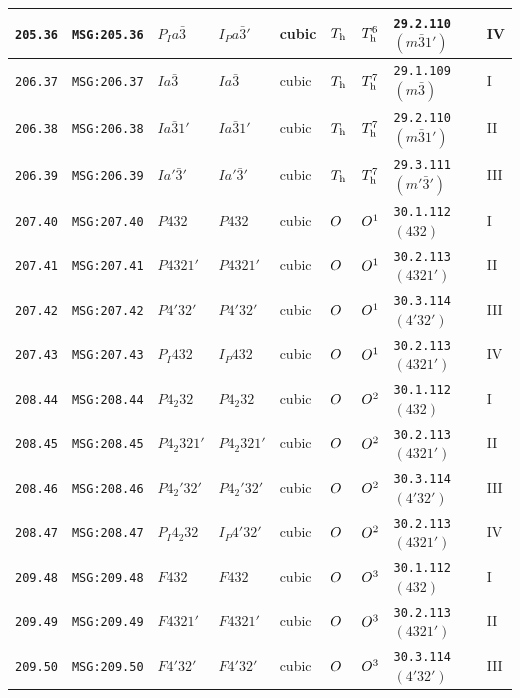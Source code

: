 \documentclass[fleqn,10pt]{jsarticle}
\begin{document}
\begin{center}
\begin{longtable}{lllllllll}
\texttt{205.36} & \texttt{MSG:205.36} & $P_{I}a\bar{3}$ & $I_{P}a\bar{3}'$ & cubic & $T_{\rm h}$ & $T_{\rm h}^{6}$ & \texttt{29.2.110} $(m\bar{3}1')$ & IV \\ \hline
\texttt{206.37} & \texttt{MSG:206.37} & $Ia\bar{3}$ & $Ia\bar{3}$ & cubic & $T_{\rm h}$ & $T_{\rm h}^{7}$ & \texttt{29.1.109} $(m\bar{3})$ & I \\
\texttt{206.38} & \texttt{MSG:206.38} & $Ia\bar{3}1'$ & $Ia\bar{3}1'$ & cubic & $T_{\rm h}$ & $T_{\rm h}^{7}$ & \texttt{29.2.110} $(m\bar{3}1')$ & II \\
\texttt{206.39} & \texttt{MSG:206.39} & $Ia'\bar{3}'$ & $Ia'\bar{3}'$ & cubic & $T_{\rm h}$ & $T_{\rm h}^{7}$ & \texttt{29.3.111} $(m'\bar{3}')$ & III \\ \hline
\texttt{207.40} & \texttt{MSG:207.40} & $P432$ & $P432$ & cubic & $O_{\rm }$ & $O_{\rm }^{1}$ & \texttt{30.1.112} $(432)$ & I \\
\texttt{207.41} & \texttt{MSG:207.41} & $P4321'$ & $P4321'$ & cubic & $O_{\rm }$ & $O_{\rm }^{1}$ & \texttt{30.2.113} $(4321')$ & II \\
\texttt{207.42} & \texttt{MSG:207.42} & $P4'32'$ & $P4'32'$ & cubic & $O_{\rm }$ & $O_{\rm }^{1}$ & \texttt{30.3.114} $(4'32')$ & III \\
\texttt{207.43} & \texttt{MSG:207.43} & $P_{I}432$ & $I_{P}432$ & cubic & $O_{\rm }$ & $O_{\rm }^{1}$ & \texttt{30.2.113} $(4321')$ & IV \\ \hline
\texttt{208.44} & \texttt{MSG:208.44} & $P4_{2}32$ & $P4_{2}32$ & cubic & $O_{\rm }$ & $O_{\rm }^{2}$ & \texttt{30.1.112} $(432)$ & I \\
\texttt{208.45} & \texttt{MSG:208.45} & $P4_{2}321'$ & $P4_{2}321'$ & cubic & $O_{\rm }$ & $O_{\rm }^{2}$ & \texttt{30.2.113} $(4321')$ & II \\
\texttt{208.46} & \texttt{MSG:208.46} & $P4_{2}'32'$ & $P4_{2}'32'$ & cubic & $O_{\rm }$ & $O_{\rm }^{2}$ & \texttt{30.3.114} $(4'32')$ & III \\
\texttt{208.47} & \texttt{MSG:208.47} & $P_{I}4_{2}32$ & $I_{P}4'32'$ & cubic & $O_{\rm }$ & $O_{\rm }^{2}$ & \texttt{30.2.113} $(4321')$ & IV \\ \hline
\texttt{209.48} & \texttt{MSG:209.48} & $F432$ & $F432$ & cubic & $O_{\rm }$ & $O_{\rm }^{3}$ & \texttt{30.1.112} $(432)$ & I \\
\texttt{209.49} & \texttt{MSG:209.49} & $F4321'$ & $F4321'$ & cubic & $O_{\rm }$ & $O_{\rm }^{3}$ & \texttt{30.2.113} $(4321')$ & II \\
\texttt{209.50} & \texttt{MSG:209.50} & $F4'32'$ & $F4'32'$ & cubic & $O_{\rm }$ & $O_{\rm }^{3}$ & \texttt{30.3.114} $(4'32')$ & III \\

\end{longtable}
\end{center}
\end{document}
